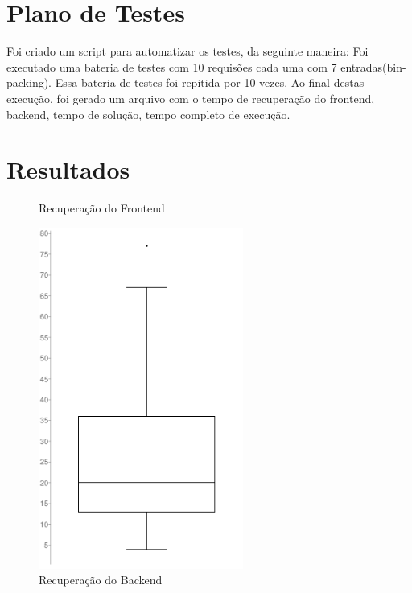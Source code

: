 \documentclass[12pt]{article}
\begin{document}
\section{Plano de Testes}

Foi criado um script para automatizar os testes, da seguinte maneira: Foi executado uma bateria de testes com 10 requisões cada uma com 7 entradas(bin-packing). Essa bateria de testes foi repitida por 10 vezes. Ao final destas execução, foi gerado um arquivo com o tempo de recuperação do frontend, backend, tempo de solução, tempo completo de execução.

\section{Resultados}

\begin{figure}[H]
    \begin{minipage}[H]{0.5\textwidth}
        \caption{Recuperação do Frontend}
        \centering
        \includegraphics[width=0.6\textwidth]{picture/imagem1.png}
    \end{minipage}
    \begin{minipage}[H]{0.5\textwidth}
        \caption{Recuperação do Backend}
        \centering

\end{minipage}
\end{figure}
\end{document}
